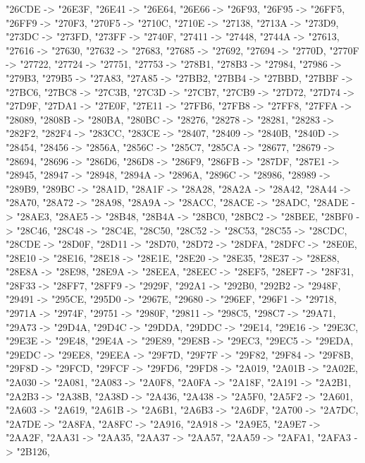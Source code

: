 {  "26CDE -> "26E3F,
  "26E41 -> "26E64,
  "26E66 -> "26F93,
  "26F95 -> "26FF5,
  "26FF9 -> "270F3,
  "270F5 -> "2710C,
  "2710E -> "27138,
  "2713A -> "273D9,
  "273DC -> "273FD,
  "273FF -> "2740F,
  "27411 -> "27448,
  "2744A -> "27613,
  "27616 -> "27630,
  "27632 -> "27683,
  "27685 -> "27692,
  "27694 -> "2770D,
  "2770F -> "27722,
  "27724 -> "27751,
  "27753 -> "278B1,
  "278B3 -> "27984,
  "27986 -> "279B3,
  "279B5 -> "27A83,
  "27A85 -> "27BB2,
  "27BB4 -> "27BBD,
  "27BBF -> "27BC6,
  "27BC8 -> "27C3B,
  "27C3D -> "27CB7,
  "27CB9 -> "27D72,
  "27D74 -> "27D9F,
  "27DA1 -> "27E0F,
  "27E11 -> "27FB6,
  "27FB8 -> "27FF8,
  "27FFA -> "28089,
  "2808B -> "280BA,
  "280BC -> "28276,
  "28278 -> "28281,
  "28283 -> "282F2,
  "282F4 -> "283CC,
  "283CE -> "28407,
  "28409 -> "2840B,
  "2840D -> "28454,
  "28456 -> "2856A,
  "2856C -> "285C7,
  "285CA -> "28677,
  "28679 -> "28694,
  "28696 -> "286D6,
  "286D8 -> "286F9,
  "286FB -> "287DF,
  "287E1 -> "28945,
  "28947 -> "28948,
  "2894A -> "2896A,
  "2896C -> "28986,
  "28989 -> "289B9,
  "289BC -> "28A1D,
  "28A1F -> "28A28,
  "28A2A -> "28A42,
  "28A44 -> "28A70,
  "28A72 -> "28A98,
  "28A9A -> "28ACC,
  "28ACE -> "28ADC,
  "28ADE -> "28AE3,
  "28AE5 -> "28B48,
  "28B4A -> "28BC0,
  "28BC2 -> "28BEE,
  "28BF0 -> "28C46,
  "28C48 -> "28C4E,
  "28C50,
  "28C52 -> "28C53,
  "28C55 -> "28CDC,
  "28CDE -> "28D0F,
  "28D11 -> "28D70,
  "28D72 -> "28DFA,
  "28DFC -> "28E0E,
  "28E10 -> "28E16,
  "28E18 -> "28E1E,
  "28E20 -> "28E35,
  "28E37 -> "28E88,
  "28E8A -> "28E98,
  "28E9A -> "28EEA,
  "28EEC -> "28EF5,
  "28EF7 -> "28F31,
  "28F33 -> "28FF7,
  "28FF9 -> "2929F,
  "292A1 -> "292B0,
  "292B2 -> "2948F,
  "29491 -> "295CE,
  "295D0 -> "2967E,
  "29680 -> "296EF,
  "296F1 -> "29718,
  "2971A -> "2974F,
  "29751 -> "2980F,
  "29811 -> "298C5,
  "298C7 -> "29A71,
  "29A73 -> "29D4A,
  "29D4C -> "29DDA,
  "29DDC -> "29E14,
  "29E16 -> "29E3C,
  "29E3E -> "29E48,
  "29E4A -> "29E89,
  "29E8B -> "29EC3,
  "29EC5 -> "29EDA,
  "29EDC -> "29EE8,
  "29EEA -> "29F7D,
  "29F7F -> "29F82,
  "29F84 -> "29F8B,
  "29F8D -> "29FCD,
  "29FCF -> "29FD6,
  "29FD8 -> "2A019,
  "2A01B -> "2A02E,
  "2A030 -> "2A081,
  "2A083 -> "2A0F8,
  "2A0FA -> "2A18F,
  "2A191 -> "2A2B1,
  "2A2B3 -> "2A38B,
  "2A38D -> "2A436,
  "2A438 -> "2A5F0,
  "2A5F2 -> "2A601,
  "2A603 -> "2A619,
  "2A61B -> "2A6B1,
  "2A6B3 -> "2A6DF,
  "2A700 -> "2A7DC,
  "2A7DE -> "2A8FA,
  "2A8FC -> "2A916,
  "2A918 -> "2A9E5,
  "2A9E7 -> "2AA2F,
  "2AA31 -> "2AA35,
  "2AA37 -> "2AA57,
  "2AA59 -> "2AFA1,
  "2AFA3 -> "2B126,
}
